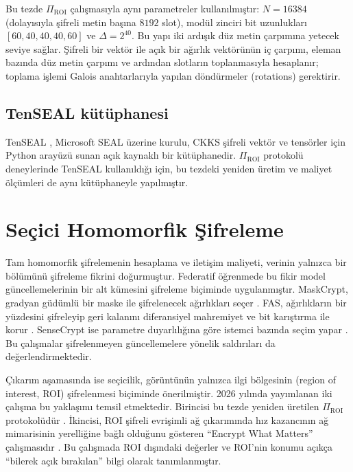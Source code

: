 Bu tezde $\Pi_{\mathrm{ROI}}$ çalışmasıyla aynı parametreler kullanılmıştır: $N = 16384$ (dolayısıyla şifreli metin başına $8192$ slot), modül zinciri bit uzunlukları $[60, 40, 40, 40, 60]$ ve $\Delta = 2^{40}$. Bu yapı iki ardışık düz metin çarpımına yetecek seviye sağlar. Şifreli bir vektör ile açık bir ağırlık vektörünün iç çarpımı, eleman bazında düz metin çarpımı ve ardından slotların toplanmasıyla hesaplanır; toplama işlemi Galois anahtarlarıyla yapılan döndürmeler (rotations) gerektirir.

\subsection{TenSEAL kütüphanesi}\label{sec:tenseal}

TenSEAL \cite{benaissa2021tenseal}, Microsoft SEAL üzerine kurulu, CKKS şifreli vektör ve tensörler için Python arayüzü sunan açık kaynaklı bir kütüphanedir. $\Pi_{\mathrm{ROI}}$ protokolü deneylerinde TenSEAL kullanıldığı için, bu tezdeki yeniden üretim ve maliyet ölçümleri de aynı kütüphaneyle yapılmıştır.

\section{Seçici Homomorfik Şifreleme}\label{sec:selective}

Tam homomorfik şifrelemenin hesaplama ve iletişim maliyeti, verinin yalnızca bir bölümünü şifreleme fikrini doğurmuştur. Federatif öğrenmede bu fikir model güncellemelerinin bir alt kümesini şifreleme biçiminde uygulanmıştır. MaskCrypt, gradyan güdümlü bir maske ile şifrelenecek ağırlıkları seçer \cite{hu2025maskcrypt}. FAS, ağırlıkların bir yüzdesini şifreleyip geri kalanını diferansiyel mahremiyet ve bit karıştırma ile korur \cite{korkmaz2025fas}. SenseCrypt ise parametre duyarlılığına göre istemci bazında seçim yapar \cite{li2025sensecrypt}. Bu çalışmalar şifrelenmeyen güncellemelere yönelik saldırıları da değerlendirmektedir.

Çıkarım aşamasında ise seçicilik, görüntünün yalnızca ilgi bölgesinin (region of interest, ROI) şifrelenmesi biçiminde önerilmiştir. 2026 yılında yayımlanan iki çalışma bu yaklaşımı temsil etmektedir. Birincisi bu tezde yeniden üretilen $\Pi_{\mathrm{ROI}}$ protokolüdür \cite{bakas2026roi}. İkincisi, ROI şifreli evrişimli ağ çıkarımında hız kazancının ağ mimarisinin yerelliğine bağlı olduğunu gösteren ``Encrypt What Matters'' çalışmasıdır \cite{backour2026encrypt}. Bu çalışmada ROI dışındaki değerler ve ROI'nin konumu açıkça ``bilerek açık bırakılan'' bilgi olarak tanımlanmıştır.

